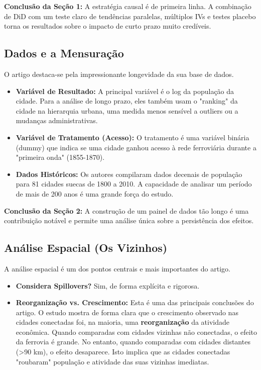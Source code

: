 \documentclass[12pt, a4paper]{article}
\begin{document}
\noindent\textbf{Conclusão da Seção 1:} A estratégia causal é de primeira linha. A combinação de DiD com um teste claro de tendências paralelas, múltiplos IVs e testes placebo torna os resultados sobre o impacto de curto prazo muito credíveis.

\subsection{Dados e a Mensuração}
O artigo destaca-se pela impressionante longevidade da sua base de dados.
\begin{itemize}
    \item \textbf{Variável de Resultado:} A principal variável é o log da população da cidade. Para a análise de longo prazo, eles também usam o "ranking" da cidade na hierarquia urbana, uma medida menos sensível a outliers ou a mudanças administrativas.
    \item \textbf{Variável de Tratamento (Acesso):} O tratamento é uma variável binária (dummy) que indica se uma cidade ganhou acesso à rede ferroviária durante a "primeira onda" (1855-1870).
    \item \textbf{Dados Históricos:} Os autores compilaram dados decenais de população para 81 cidades suecas de 1800 a 2010. A capacidade de analisar um período de mais de 200 anos é uma grande força do estudo.
\end{itemize}

\noindent\textbf{Conclusão da Seção 2:} A construção de um painel de dados tão longo é uma contribuição notável e permite uma análise única sobre a persistência dos efeitos.

\subsection{Análise Espacial (Os Vizinhos)}
A análise espacial é um dos pontos centrais e mais importantes do artigo.
\begin{itemize}
    \item \textbf{Considera Spillovers?} Sim, de forma explícita e rigorosa.
    \item \textbf{Reorganização vs. Crescimento:} Esta é uma das principais conclusões do artigo. O estudo mostra de forma clara que o crescimento observado nas cidades conectadas foi, na maioria, uma \textbf{reorganização} da atividade econômica. Quando comparadas com cidades vizinhas não conectadas, o efeito da ferrovia é grande. No entanto, quando comparadas com cidades distantes (>90 km), o efeito desaparece. Isto implica que as cidades conectadas "roubaram" população e atividade das suas vizinhas imediatas.
\end{itemize}
\end{document}
